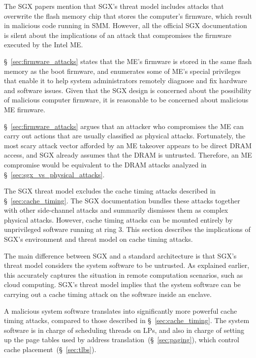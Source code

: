 The SGX papers mention that SGX's threat model includes attacks that overwrite
the flash memory chip that stores the computer's firmware, which result in
malicious code running in SMM.  However, all the official SGX documentation is
silent about the implications of an attack that compromises the firmware
executed by the Intel ME.

\S~\ref{sec:firmware_attacks} states that the ME's firmware is stored in the
same flash memory as the boot firmware, and enumerates some of ME's special
privileges that enable it to help system administrators remotely diagnose and
fix hardware and software issues. Given that the SGX design is concerned about
the possibility of malicious computer firmware, it is reasonable to be
concerned about malicious ME firmware.

\S~\ref{sec:firmware_attacks} argues that an attacker who compromises the ME
can carry out actions that are usually classified as physical attacks.
Fortunately, the most scary attack vector afforded by an ME takeover appears to
be direct DRAM access, and SGX already assumes that the DRAM is untrusted.
Therefore, an ME compromise would be equivalent to the DRAM attacks analyzed in
\S~\ref{sec:sgx_vs_physical_attacks}.


\label{sec:sgx_vs_cache_timing_attacks}

The SGX threat model excludes the cache timing attacks described in
\S~\ref{sec:cache_timing}. The SGX documentation bundles these attacks together
with other side-channel attacks and summarily dismisses them as complex physical
attacks. However, cache timing attacks can be mounted entirely by unprivileged
software running at ring 3. This section describes the implications of SGX's
environment and threat model on cache timing attacks.

The main difference between SGX and a standard architecture is that SGX's
threat model considers the system software to be untrusted. As explained
earlier, this accurately captures the situation in remote computation
scenarios, such as cloud computing. SGX's threat model implies that the system
software can be carrying out a cache timing attack on the software inside an
enclave.

A malicious system software translates into significantly more powerful cache
timing attacks, compared to those described in \S~\ref{sec:cache_timing}. The
system software is in charge of scheduling threads on LPs, and also in charge
of setting up the page tables used by address
translation~(\S~\ref{sec:paging}), which control cache
placement~(\S~\ref{sec:tlbs}).

